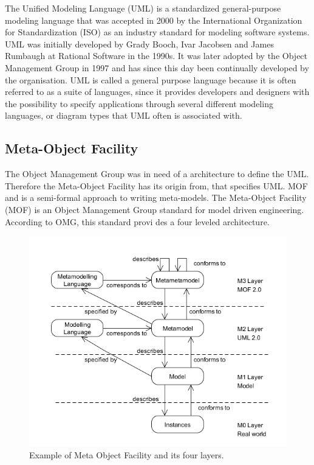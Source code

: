 The Unified Modeling Language\cite{UML,UML_SPEC} (UML) is a standardized
general-purpose modeling language that was accepted in 2000 by the International
Organization for Standardization (ISO) as an industry standard for modeling
software systems. UML was initially developed by Grady Booch, Ivar Jacobsen and
James Rumbaugh at Rational Software in the 1990s. It was later adopted by the
Object Management Group in 1997 and has since this day been continually
developed by the organisation. UML is called a general purpose language because
it is often referred to as a suite of languages, since it provides developers
and designers with the possibility to specify applications through several different
modeling languages, or diagram types that UML often is associated with. 

\subsection{Meta-Object Facility}

The Object Management Group was in need of a architecture to define the
UML. Therefore the Meta-Object Facility has its origin from, that specifies UML.
MOF and is a semi-formal approach to writing meta-models. The Meta-Object
Facility\cite{MOF} (MOF) is an Object Management Group standard for model
driven engineering. According to OMG, this standard provi des a four leveled
architecture.

\begin{figure}[H]
	\centering
	\includegraphics[scale=0.6]{./Figures/MOFLayers.png}
	\caption[Meta Object Facility]
	{Example of Meta Object Facility and its four layers.}
	\label{fig:MOFLayers}
\end{figure}

